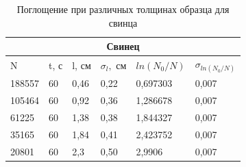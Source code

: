 \documentclass[a4paper,12pt]{article} %
\begin{document}
\begin{table}[h!]
\begin{center}

\begin{tabular}{|llllll|}
\hline
\multicolumn{6}{|c|}{Свинец}                                                                                                                                                          \\ \hline
\multicolumn{1}{|l|}{N}      & \multicolumn{1}{l|}{t, с} & \multicolumn{1}{l|}{l, см} & \multicolumn{1}{l|}{$\sigma_l,$ см} & \multicolumn{1}{l|}{$ln(N_0/N)$} & $\sigma_{ln(N_0/N)}$ \\ \hline
\multicolumn{1}{|l|}{188557} & \multicolumn{1}{l|}{60}   & \multicolumn{1}{l|}{0,46}  & \multicolumn{1}{l|}{0,22}           & \multicolumn{1}{l|}{0,697303}    & 0,007                \\ \hline
\multicolumn{1}{|l|}{105464} & \multicolumn{1}{l|}{60}   & \multicolumn{1}{l|}{0,92}  & \multicolumn{1}{l|}{0,36}           & \multicolumn{1}{l|}{1,286678}    & 0,007                \\ \hline
\multicolumn{1}{|l|}{61225}  & \multicolumn{1}{l|}{60}   & \multicolumn{1}{l|}{1,38}  & \multicolumn{1}{l|}{0,38}           & \multicolumn{1}{l|}{1,844327}    & 0,007                \\ \hline
\multicolumn{1}{|l|}{35165}  & \multicolumn{1}{l|}{60}   & \multicolumn{1}{l|}{1,84}  & \multicolumn{1}{l|}{0,41}           & \multicolumn{1}{l|}{2,423752}    & 0,007                \\ \hline
\multicolumn{1}{|l|}{20801}  & \multicolumn{1}{l|}{60}   & \multicolumn{1}{l|}{2,3}   & \multicolumn{1}{l|}{0,50}           & \multicolumn{1}{l|}{2,9906}      & 0,007                \\ \hline
\end{tabular}

\end{center}

\caption{Поглощение при различных толщинах образца для свинца}
\end{table}
\end{document}
